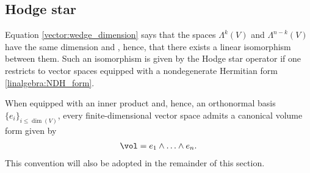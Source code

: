 \subsection{Hodge star}

    Equation \eqref{vector:wedge_dimension} says that the spaces $\Lambda^k(V)$ and $\Lambda^{n-k}(V)$ have the same dimension and , hence, that there exists a linear isomorphism between them. Such an isomorphism is given by the Hodge star operator if one restricts to vector spaces equipped with a nondegenerate Hermitian form \ref{linalgebra:NDH_form}.

    When equipped with an inner product and, hence, an orthonormal basis $\{e_i\}_{i\leq\dim(V)}$, every finite-dimensional vector space admits a canonical volume form given by
    \begin{gather}
        \vol = e_1\wedge\ldots\wedge e_n.
    \end{gather}
    This convention will also be adopted in the remainder of this section.


